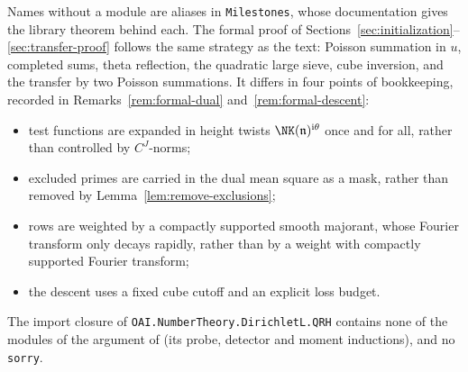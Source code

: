 \medskip
Names without a module are aliases in \texttt{Milestones}, whose documentation gives the
library theorem behind each. The formal proof of
Sections~\ref{sec:initialization}--\ref{sec:transfer-proof} follows the same strategy as the
text: Poisson summation in $u$, completed sums, theta reflection, the quadratic large sieve, cube
inversion, and the transfer by two Poisson summations. It differs in four points of
bookkeeping, recorded in Remarks~\ref{rem:formal-dual} and~\ref{rem:formal-descent}:
\begin{itemize}
\item test functions are expanded in height twists $\NK(\mathfrak n)^{\mathrm i\theta}$ once and
for all, rather than controlled by $C^J$-norms;
\item excluded primes are carried in the dual mean square as a mask, rather than removed by
Lemma~\ref{lem:remove-exclusions};
\item rows are weighted by a compactly supported smooth majorant, whose Fourier transform only
decays rapidly, rather than by a weight with compactly supported Fourier transform;
\item the descent uses a fixed cube cutoff and an explicit loss budget.
\end{itemize}
The import closure of \texttt{OAI.NumberTheory.\allowbreak DirichletL.\allowbreak QRH} contains none of the modules of
the argument of \cite{OpenAI26} (its probe, detector and moment inductions), and no
\texttt{sorry}.
